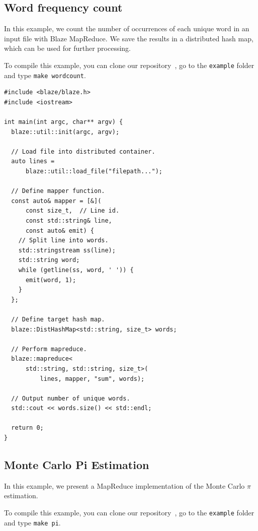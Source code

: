 \subsection{Word frequency count}
\label{app:wordcount}
In this example, we count the number of occurrences of each unique word in an input file with Blaze MapReduce.
We save the results in a distributed hash map, which can be used for further processing.

To compile this example, you can clone our repository~\cite{blaze}, go to the \lstinline{example} folder and type \lstinline{make wordcount}.

\begin{lstlisting}
#include <blaze/blaze.h>
#include <iostream>

int main(int argc, char** argv) {
  blaze::util::init(argc, argv);
  
  // Load file into distributed container.
  auto lines =
      blaze::util::load_file("filepath...");

  // Define mapper function.
  const auto& mapper = [&](
      const size_t,  // Line id.
      const std::string& line,
      const auto& emit) {
    // Split line into words.
    std::stringstream ss(line);
    std::string word;
    while (getline(ss, word, ' ')) {
      emit(word, 1);
    }
  };

  // Define target hash map.
  blaze::DistHashMap<std::string, size_t> words;

  // Perform mapreduce.
  blaze::mapreduce<
      std::string, std::string, size_t>(
          lines, mapper, "sum", words);
    
  // Output number of unique words.
  std::cout << words.size() << std::endl;
  
  return 0;
}
\end{lstlisting}

\subsection{Monte Carlo Pi Estimation}
\label{app:pi}

In this example, we present a MapReduce implementation of the Monte Carlo $\pi$ estimation.

To compile this example, you can clone our repository~\cite{blaze}, go to the \lstinline{example} folder and type \lstinline{make pi}.

